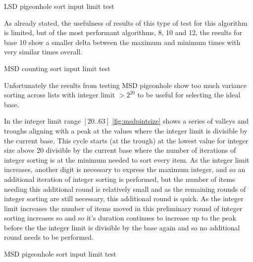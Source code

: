 \documentclass[12pt]{article}
\begin{document}
	\begin{table}[h]
		\centering
		\captionsetup{type=figure}
			\caption{LSD pigeonhole sort input limit test\label{fig:lsdpintsize}}
	\end{table}
	\pagebreak
	As already stated, the usefulness of results of this type of test for this algorithm is limited, but of the most performant algorithms, 8, 10 and 12, the results for base 10 show a smaller delta between the maximum and minimum times with very similar times overall.
	\begin{table}[h]
		\centering
		\captionsetup{type=figure}
			\caption{MSD counting sort input limit test\label{fig:msdcintsize}}
	\end{table}
	Unfortunately the results from testing MSD pigeonhole show too much variance sorting across lists with integer limit $>2^{20}$ to be useful for selecting the ideal base.
	\par
	In the integer limit range $[20..63]$ \ref{fig:msdpintsize} shows a series of valleys and troughs aligning with a peak at the values where the integer limit is divisible by the current base. This cycle starts (at the trough) at the lowest value for integer size above 20 divisible by the current base where the number of iterations of integer sorting is at the minimum needed to sort every item. As the integer limit increases, another digit is necessary to express the maximum integer, and so an additional iteration of integer sorting is performed, but the number of items needing this additional round is relatively small and as the remaining rounds of integer sorting are still necessary, this additional round is quick. As the integer limit increases the number of items moved in this preliminary round of integer sorting increases so and so it's duration continues to increase up to the peak before the the integer limit is divisible by the base again and so no additional round needs to be performed.
	\begin{table}[h]
		\centering
		\captionsetup{type=figure}
			\caption{MSD pigeonhole sort input limit test\label{fig:msdpintsize}}
	\end{table}
	\pagebreak
\end{document}
